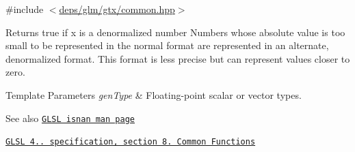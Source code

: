 {\ttfamily \#include $<$\hyperlink{gtx_2common_8hpp}{deps/glm/gtx/common.\+hpp}$>$}

Returns true if x is a denormalized number Numbers whose absolute value is too small to be represented in the normal format are represented in an alternate, denormalized format. This format is less precise but can represent values closer to zero.


\begin{DoxyTemplParams}{Template Parameters}
{\em gen\+Type} & Floating-\/point scalar or vector types.\\
\hline
\end{DoxyTemplParams}
\begin{DoxySeeAlso}{See also}
\href{http://www.opengl.org/sdk/docs/manglsl/xhtml/isnan.xml}{\tt G\+L\+SL isnan man page} 

\href{http://www.opengl.org/registry/doc/GLSLangSpec.4.20.8.pdf}{\tt G\+L\+SL 4.. specification, section 8. Common Functions} 
\end{DoxySeeAlso}

